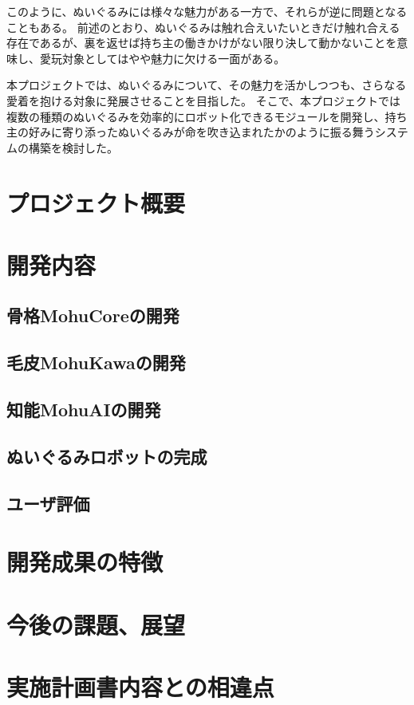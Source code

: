 \documentclass[uplatex,a4paper,12pt]{jsarticle}
\begin{document}
このように、ぬいぐるみには様々な魅力がある一方で、それらが逆に問題となることもある。
前述のとおり、ぬいぐるみは触れ合えいたいときだけ触れ合える存在であるが、裏を返せば持ち主の働きかけがない限り決して動かないことを意味し、愛玩対象としてはやや魅力に欠ける一面がある。

本プロジェクトでは、ぬいぐるみについて、その魅力を活かしつつも、さらなる愛着を抱ける対象に発展させることを目指した。
そこで、本プロジェクトでは複数の種類のぬいぐるみを効率的にロボット化できるモジュールを開発し、持ち主の好みに寄り添ったぬいぐるみが命を吹き込まれたかのように振る舞うシステムの構築を検討した。



\section{プロジェクト概要}

\section{開発内容}
\subsection{骨格MohuCoreの開発}
\subsection{毛皮MohuKawaの開発}
\subsection{知能MohuAIの開発}
\subsection{ぬいぐるみロボットの完成}
\subsection{ユーザ評価}

\section{開発成果の特徴}

\section{今後の課題、展望}


\section{実施計画書内容との相違点}
\end{document}
